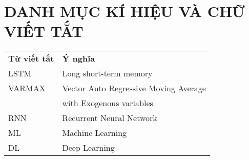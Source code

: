 \documentclass[13pt]{report}
\numberwithin{equation}{section}
\begin{document}
	{\let\oldnumberline\numberline
\renewcommand{\numberline}{Hình~\oldnumberline}
\listoffigures} 
\thispagestyle{empty}
\newpage
	
	\newpage
	{\let\oldnumberline\numberline
\renewcommand{\numberline}{Bảng~\oldnumberline}
\listoftables}
\thispagestyle{empty}
	\newpage
	\newpage
	\chapter*{DANH MỤC KÍ HIỆU VÀ CHỮ VIẾT TẮT}
	\begin{table}[htp]
		\centering
		\begin{tabular}{ll}
			
			\textbf{Từ viết tắt} & \textbf{Ý nghĩa}\\
			LSTM & Long short-term memory \\
                VARMAX & Vector Auto Regressive Moving Average \\ 
                 & with Exogenous variables\\
    		RNN & Recurrent Neural Network\\
    		ML & Machine Learning\\
    		DL & Deep Learning\\
		\end{tabular}
	\end{table}~
\\
\thispagestyle{empty}
	\newpage
	
	
	
	

 
	
\end{document}
